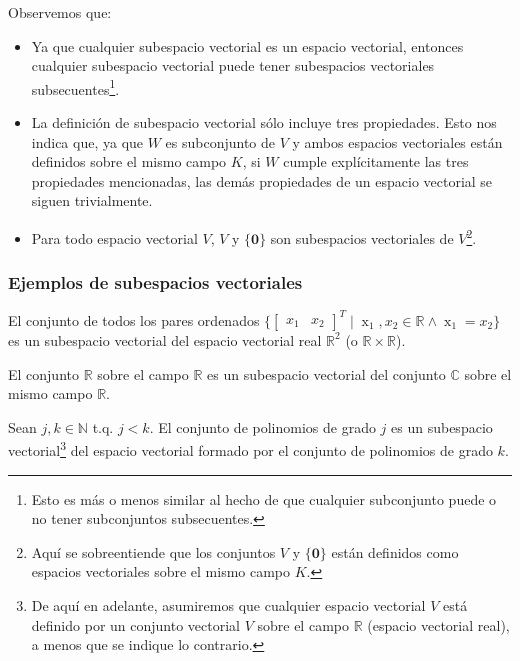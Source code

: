 \documentclass[12pt]{article}
\begin{document}
Observemos que:

\begin{itemize}
    \item Ya que cualquier subespacio vectorial es un espacio vectorial, entonces cualquier subespacio vectorial puede tener subespacios vectoriales subsecuentes\footnote{Esto es más o menos similar al hecho de que cualquier subconjunto puede o no tener subconjuntos subsecuentes.}.
    \item La definición de subespacio vectorial sólo incluye tres propiedades. Esto nos indica que, ya que $W$ es subconjunto de $V$ y ambos espacios vectoriales están definidos sobre el mismo campo $K$, si $W$ cumple explícitamente las tres propiedades mencionadas, las demás propiedades de un espacio vectorial se siguen trivialmente.
    \item Para todo espacio vectorial $V$, $V$ y $\{\mathbf{0}\}$ son subespacios vectoriales de $V$\footnote{Aquí se sobreentiende que los conjuntos $V$ y $\{\mathbf{0}\}$ están definidos como espacios vectoriales sobre el mismo campo $K$.}.
\end{itemize}{}

\subsubsection{Ejemplos de subespacios vectoriales}

El conjunto de todos los pares ordenados $\{\begin{bmatrix} x_1&x_2\end{bmatrix}^T\mathop |\mathop x_1,x_2\in\mathbb{R}\mathop\land\mathop x_1=x_2\}$ es un subespacio vectorial del espacio vectorial real $\mathbb{R}^2$ (o $\mathbb{R}\times \mathbb{R}$).

\vspace{3mm}

El conjunto $\mathbb{R}$ sobre el campo $\mathbb{R}$ es un subespacio vectorial del conjunto $\mathbb{C}$ sobre el mismo campo $\mathbb{R}$.

\vspace{3mm}

Sean $j,k\in\mathbb{N}$ t.q. $j<k$. El conjunto de polinomios de grado $j$ es un subespacio vectorial\footnote{De aquí en adelante, asumiremos que cualquier espacio vectorial $V$ está definido por un conjunto vectorial $V$ sobre el campo $\mathbb{R}$ (espacio vectorial real), a menos que se indique lo contrario.} del espacio vectorial formado por el conjunto de polinomios de grado $k$.
\end{document}
